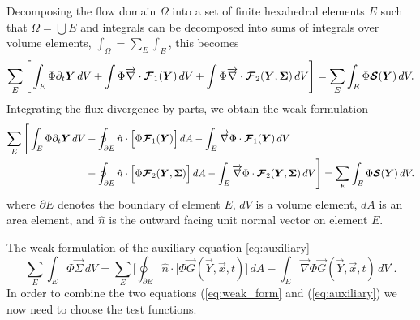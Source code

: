 \documentclass{report}
\numberwithin{equation}{section}
\begin{document}
 Decomposing the flow domain $\Omega$ into a set of finite hexahedral elements $E$ such that $\Omega =\bigcup E$ and integrals can be decomposed into sums of integrals over volume elements, $\int_\Omega = \sum_{E} \int_{E}$, this becomes
\begin{align}
    \sum_E \Bigg[ \int_E \Phi \partial_t \boldsymbol{{Y}} \, dV
    + \int \Phi \overrightarrow{\nabla} \cdot \boldsymbol{{\mathcal{F}}}_1(\boldsymbol{{Y}}) \, dV
    + \int \Phi \overrightarrow{\nabla} \cdot \boldsymbol{{\mathcal{F}}}_2(\boldsymbol{{Y}}, \boldsymbol{{\Sigma}}) \, dV \Bigg]
    = \sum_{E} \int_{E} \Phi \boldsymbol{{\mathcal{S}}}(\boldsymbol{{Y}}) \, dV.
\end{align}
Integrating the flux divergence by parts, we obtain the weak formulation
\begin{align}
    \sum_{E} \Bigg[ \int_E \Phi \partial_t \boldsymbol{{Y}} \, dV 
    & + \oint_{\partial E} \hat n \cdot \Big[ \Phi \boldsymbol{{\mathcal{F}}}_1(\boldsymbol{{Y}}) \Big] \, dA 
    - \int_E \overrightarrow{\nabla} \Phi \cdot \boldsymbol{{\mathcal{F}}}_1(\boldsymbol{{Y}}) \, dV  \label{eq:weak_form} \\
    & + \oint_{\partial E} \hat n \cdot \Big[ \Phi \boldsymbol{{\mathcal{F}}}_2(\boldsymbol{{Y}}, \boldsymbol{{\Sigma}}) \Big] \, dA
    - \int_E \overrightarrow{\nabla} \Phi \cdot \boldsymbol{{\mathcal{F}}}_2(\boldsymbol{{Y}}, \boldsymbol{{\Sigma}}) \, dV \Bigg]
    = \sum_{E} \int_E \Phi \boldsymbol{{\mathcal{S}}}(\boldsymbol{{Y}}) \, dV. \nonumber
\end{align}
where $\partial E$ denotes the boundary of element $E$, $dV$ is a volume element, $dA$ is an area element, and $\hat n$ is the outward facing unit normal vector on element $E$. 

The weak formulation of the auxiliary equation \eqref{eq:auxiliary} 
\begin{equation}
    \sum_{E} \int_E \Phi \vec \Sigma \, dV
    = \sum_{E} \Bigg[ \oint_{\partial E} \hat n \cdot \bigl[\Phi \vec G(\vec Y, \overrightarrow{x}, t)\bigr] \, dA
    - \int_E \overrightarrow{\nabla} \Phi \vec G(\vec Y, \overrightarrow{x}, t) \, dV \Bigg].
\end{equation}
In order to combine the two equations (\ref{eq:weak_form} and (\ref{eq:auxiliary}) we now need to choose the test functions.
\end{document}
